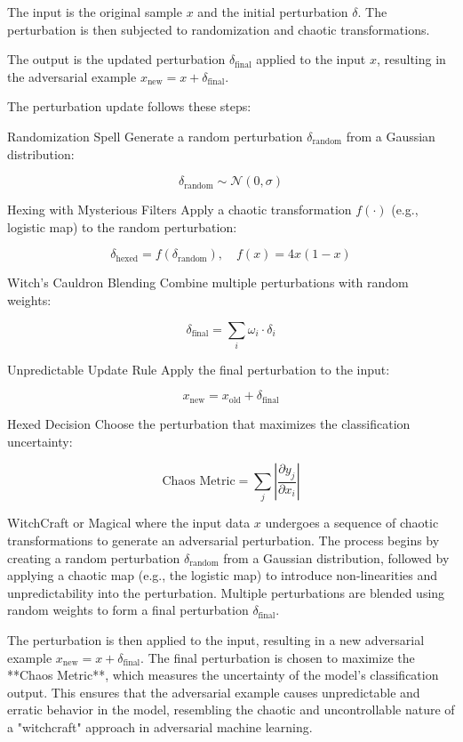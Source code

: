 The input is the original sample \(x\) and the initial perturbation \(\delta\). The perturbation is then subjected to randomization and chaotic transformations.

The output is the updated perturbation \(\delta_{\text{final}}\) applied to the input \(x\), resulting in the adversarial example \(x_{\text{new}} = x + \delta_{\text{final}}\).

The perturbation update follows these steps:

Randomization Spell Generate a random perturbation \(\delta_{\text{random}}\) from a Gaussian distribution:

\[
\delta_{\text{random}} \sim \mathcal{N}(0, \sigma)
\]

Hexing with Mysterious Filters Apply a chaotic transformation \(f(\cdot)\) (e.g., logistic map) to the random perturbation:

\[
\delta_{\text{hexed}} = f(\delta_{\text{random}}), \quad f(x) = 4x(1 - x)
\]

Witch’s Cauldron Blending Combine multiple perturbations with random weights:

\[
\delta_{\text{final}} = \sum_{i} \omega_i \cdot \delta_i
\]

Unpredictable Update Rule Apply the final perturbation to the input:

\[
x_{\text{new}} = x_{\text{old}} + \delta_{\text{final}}
\]

Hexed Decision Choose the perturbation that maximizes the classification uncertainty:

\[
\text{Chaos Metric} = \sum_j \left| \frac{\partial y_j}{\partial x_i} \right|
\]

WitchCraft or Magical where the input data \(x\) undergoes a sequence of chaotic transformations to generate an adversarial perturbation. The process begins by creating a random perturbation \(\delta_{\text{random}}\) from a Gaussian distribution, followed by applying a chaotic map (e.g., the logistic map) to introduce non-linearities and unpredictability into the perturbation. Multiple perturbations are blended using random weights to form a final perturbation \(\delta_{\text{final}}\).

The perturbation is then applied to the input, resulting in a new adversarial example \(x_{\text{new}} = x + \delta_{\text{final}}\). The final perturbation is chosen to maximize the **Chaos Metric**, which measures the uncertainty of the model’s classification output. This ensures that the adversarial example causes unpredictable and erratic behavior in the model, resembling the chaotic and uncontrollable nature of a "witchcraft" approach in adversarial machine learning.

